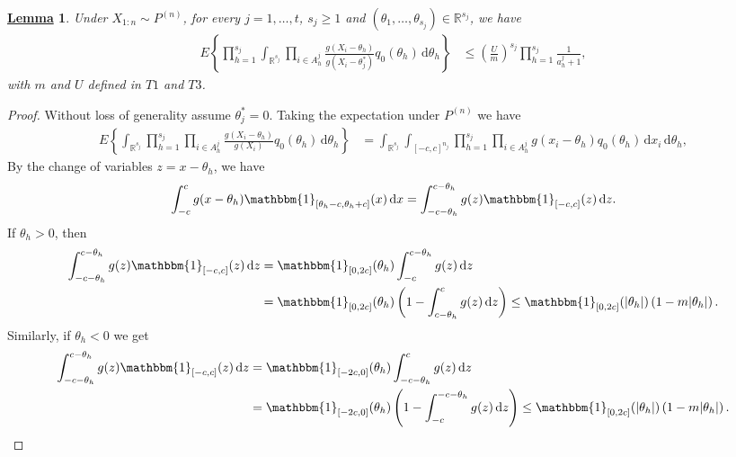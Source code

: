 \documentclass[12pt]{article}
\newtheorem{Lem}{\underline{\bf Lemma}}
\def \R {\mathbb{R} }
\begin{document}
\begin{Lem}\label{numerator}
Under $X_{1:n} \sim P^{(n)}$, for every $j = 1, \dots, t$, $s_j \geq 1$ and $(\theta_1, \dots, \theta_{s_j}) \in \mathbb{R}^{s_j}$, we have
\[
\begin{aligned}
E \left\{\prod_{h = 1}^{s_j}\int_{\R^{s_j}} \prod_{i \in A^j_h} \frac{g(X_i - \theta_h)}{g(X_i-\theta_j^*)} q_0(\theta_h)\, \mathrm{d}\theta_h \right\} 
&\leq \left(\frac{U}{m}\right)^{s_j}\prod_{h= 1}^{s_j} \frac{1}{a^j_h+1},
\end{aligned}
\]
with $m$ and $U$ defined in $T1$ and $T3$. 
\end{Lem}
\begin{proof}
Without loss of generality assume $\theta_j^* = 0$. Taking the expectation under $P^{(n)}$ we have
\begin{equation}\label{expectation_num}
\begin{aligned}
E \left\{\int_{\R^{s_j}} \prod_{h = 1}^{s_j} \prod_{i \in A^j_h} \frac{g(X_i - \theta_h)}{g(X_i)} q_0(\theta_h)\, \mathrm{d}\theta_h \right\} %
& = \int_{\R^{s_j}} \int_{[-c,c]^{n_j}} \prod_{h = 1}^{s_j} \prod_{i \in A^j_h} g(x_i - \theta_h) q_0(\theta_h) \, \mathrm{d}x_i \, \mathrm{d}\theta_h,
\end{aligned}
\end{equation}
By the change of variables $z = x-\theta_h$, we have
\[
\int_{-c}^{c}  g(x - \theta_h) \mathbbm{1}_{[\theta_h-c, \theta_h+c]}(x)\, \mathrm{d}x = \int_{-c-\theta_h}^{c-\theta_h} g(z)\mathbbm{1}_{[-c, c]}(z)\, \mathrm{d}z.
\]
If $\theta_h > 0$, then
\[
\begin{aligned}
\int_{-c-\theta_h}^{c-\theta_h} g(z)\mathbbm{1}_{[-c, c]}(z)\, \mathrm{d}z &= \mathbbm{1}_{[0, 2c]}(\theta_h)\int_{-c}^{c-\theta_h}g(z) \, \mathrm{d}z\\
& = \mathbbm{1}_{[0, 2c]}(\theta_h)\left(1-\int_{c-\theta_h}^c g(z) \, \mathrm{d}z\right) \leq \mathbbm{1}_{[0, 2c]}(|\theta_h|)\left(1-m|\theta_h|\right).
\end{aligned}
\]
Similarly, if $\theta_h < 0$ we get
\[
\begin{aligned}
\int_{-c-\theta_h}^{c-\theta_h} g(z)\mathbbm{1}_{[-c, c]}(z)\, \mathrm{d}z &= \mathbbm{1}_{[-2c, 0]}(\theta_h)\int_{-c-\theta_h}^{c}g(z) \, \mathrm{d}z\\
&= \mathbbm{1}_{[-2c, 0]}(\theta_h)\left( 1-\int_{-c}^{-c-\theta_h} g(z) \, \mathrm{d}z\right) \leq \mathbbm{1}_{[0,2c]}(|\theta_h|) \left(1-m|\theta_h|\right).

\end{aligned}\]
\end{proof}
\end{document}

